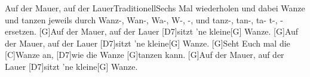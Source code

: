 \documentclass[../main.tex]{subfiles}
\begin{document}
\begin{song}{Auf der Mauer, auf der Lauer}{Traditionell}{Sechs Mal wiederholen und dabei Wanze und tanzen jeweils durch Wanz-, Wan-, Wa-, W-, -, und tanz-, tan-, ta- t-, -  ersetzen.}
[G]Auf der Mauer, auf der Lauer [D7]sitzt 'ne kleine[G] Wanze.
[G]Auf der Mauer, auf der Lauer [D7]sitzt 'ne kleine[G] Wanze.
[G]Seht Euch mal die [C]Wanze an, [D7]wie die Wanze [G]tanzen kann.
[G]Auf der Mauer, auf der Lauer [D7]sitzt 'ne kleine[G] Wanze.
\end{song}
\end{document}
